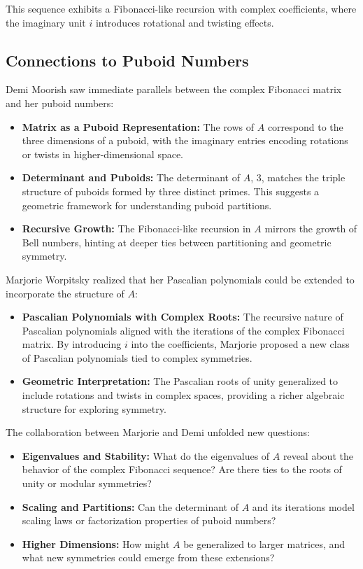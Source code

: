 This sequence exhibits a Fibonacci-like recursion with complex coefficients, where the imaginary unit \(i\) introduces rotational and twisting effects.

\subsection*{Connections to Puboid Numbers}

Demi Moorish saw immediate parallels between the complex Fibonacci matrix and her puboid numbers:
\begin{itemize}
    \item \textbf{Matrix as a Puboid Representation:} The rows of \(A\) correspond to the three dimensions of a puboid, with the imaginary entries encoding rotations or twists in higher-dimensional space.
    \item \textbf{Determinant and Puboids:} The determinant of \(A\), \(3\), matches the triple structure of puboids formed by three distinct primes. This suggests a geometric framework for understanding puboid partitions.
    \item \textbf{Recursive Growth:} The Fibonacci-like recursion in \(A\) mirrors the growth of Bell numbers, hinting at deeper ties between partitioning and geometric symmetry.
\end{itemize}
Marjorie Worpitsky realized that her Pascalian polynomials could be extended to incorporate the structure of \(A\):
\begin{itemize}
    \item \textbf{Pascalian Polynomials with Complex Roots:} The recursive nature of Pascalian polynomials aligned with the iterations of the complex Fibonacci matrix. By introducing \(i\) into the coefficients, Marjorie proposed a new class of Pascalian polynomials tied to complex symmetries.
    \item \textbf{Geometric Interpretation:} The Pascalian roots of unity generalized to include rotations and twists in complex spaces, providing a richer algebraic structure for exploring symmetry.
\end{itemize}

The collaboration between Marjorie and Demi unfolded new questions:
\begin{itemize}
    \item \textbf{Eigenvalues and Stability:} What do the eigenvalues of \(A\) reveal about the behavior of the complex Fibonacci sequence? Are there ties to the roots of unity or modular symmetries?
    \item \textbf{Scaling and Partitions:} Can the determinant of \(A\) and its iterations model scaling laws or factorization properties of puboid numbers?
    \item \textbf{Higher Dimensions:} How might \(A\) be generalized to larger matrices, and what new symmetries could emerge from these extensions?
\end{itemize}

